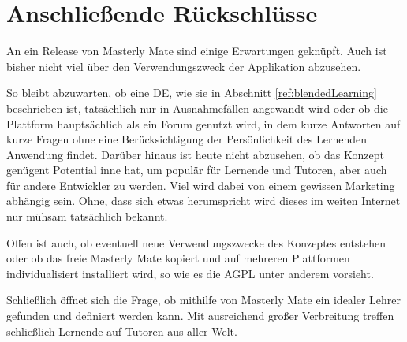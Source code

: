 \section{Anschließende Rückschlüsse}\label{ref:anschlVorh}
An ein Release von Masterly Mate sind einige Erwartungen geknüpft. Auch ist
bisher nicht viel über den Verwendungszweck der Applikation abzusehen.

So bleibt abzuwarten, ob eine DE, wie sie in Abschnitt \ref{ref:blendedLearning}
beschrieben ist, tatsächlich nur in Ausnahmefällen angewandt wird oder ob die
Plattform hauptsächlich als ein Forum genutzt wird, in dem kurze Antworten auf
kurze Fragen ohne eine Berücksichtigung der Persönlichkeit des Lernenden
Anwendung findet. Darüber hinaus ist heute nicht abzusehen, ob das Konzept
genügent Potential inne hat, um populär für Lernende und Tutoren, aber auch
für andere Entwickler zu werden. Viel wird dabei von einem gewissen Marketing
abhängig sein. Ohne, dass sich etwas herumspricht wird dieses im weiten Internet
nur mühsam tatsächlich bekannt.

Offen ist auch, ob eventuell neue Verwendungszwecke des Konzeptes entstehen oder
ob das freie Masterly Mate kopiert und auf mehreren Plattformen individualisiert
installiert wird, so wie es die AGPL unter anderem vorsieht.

Schließlich öffnet sich die Frage, ob mithilfe von Masterly Mate ein idealer
Lehrer gefunden und definiert werden kann. Mit ausreichend großer Verbreitung
treffen schließlich Lernende auf Tutoren aus aller Welt.
